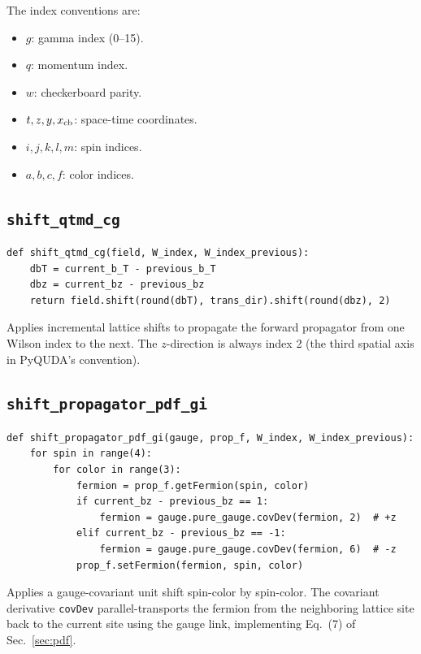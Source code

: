 \documentclass[11pt,a4paper]{article}
\begin{document}
The index conventions are:
\begin{itemize}[nosep]
  \item $g$: gamma index (0--15).
  \item $q$: momentum index.
  \item $w$: checkerboard parity.
  \item $t,z,y,x_{\rm cb}$: space-time coordinates.
  \item $i,j,k,l,m$: spin indices.
  \item $a,b,c,f$: color indices.
\end{itemize}

\subsection{\texttt{shift\_qtmd\_cg}}

\begin{lstlisting}
def shift_qtmd_cg(field, W_index, W_index_previous):
    dbT = current_b_T - previous_b_T
    dbz = current_bz - previous_bz
    return field.shift(round(dbT), trans_dir).shift(round(dbz), 2)
\end{lstlisting}

Applies incremental lattice shifts to propagate the forward propagator from one
Wilson index to the next.  The $z$-direction is always index 2 (the third
spatial axis in PyQUDA's convention).

\subsection{\texttt{shift\_propagator\_pdf\_gi}}

\begin{lstlisting}
def shift_propagator_pdf_gi(gauge, prop_f, W_index, W_index_previous):
    for spin in range(4):
        for color in range(3):
            fermion = prop_f.getFermion(spin, color)
            if current_bz - previous_bz == 1:
                fermion = gauge.pure_gauge.covDev(fermion, 2)  # +z
            elif current_bz - previous_bz == -1:
                fermion = gauge.pure_gauge.covDev(fermion, 6)  # -z
            prop_f.setFermion(fermion, spin, color)
\end{lstlisting}

Applies a gauge-covariant unit shift spin-color by spin-color.  The covariant
derivative \texttt{covDev} parallel-transports the fermion from the neighboring
lattice site back to the current site using the gauge link, implementing
Eq.~(7) of Sec.~\ref{sec:pdf}.
\end{document}
